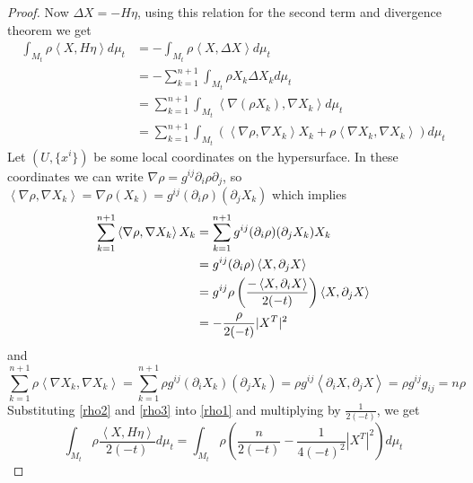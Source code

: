 \begin{proof}
Now $ \Delta X = - H \eta $, using this relation for the second term and divergence theorem we get 
\begin{align}
\int_{M_{t}}\rho \left< X,H \eta \right> d \mu_{t} & =  -\int_{M_{t}} \rho\left< X,\Delta X \right> d \mu_{t} \nonumber \\ 
& = - \sum_{k=1}^{n+1}\int_{M_{t}} \rho X_{k} \Delta X_{k} d \mu_{t}\nonumber \\
& = \sum_{k=1}^{n+1} \int_{M_{t}} \left< \nabla(\rho X_{k}), \nabla X_{k} \right>d \mu_{t}\nonumber \\ 
& = \sum_{k=1}^{n+1} \int_{M_{t}} \left( \left< \nabla\rho, \nabla X_{k} \right>X_{k} + \rho \left< \nabla X_{k}, \nabla X_{k} \right> \right)d \mu_{t} \label{rho1}
\end{align}
Let $ (U,\{x^{i}\}) $ be some local coordinates on the hypersurface. In these coordinates we can write $ \nabla \rho = g^{ij} \partial_{i} \rho \partial_{j} $, so $  \left< \nabla \rho , \nabla X_{k}\right> = \nabla \rho (X_{k}) = g^{ij} (\partial_{i}\rho) (\partial_{j}X_{k}) $ which implies 
\begin{align}
\sum_{k=1}^{n+1} \left< \nabla \rho , \nabla X_{k}  \right> X_{k} & = \sum_{k=1}^{n+1}  g^{ij} (\partial_{i}\rho) (\partial_{j}X_{k}) X_{k}\nonumber \\ 
& = g^{ij}( \partial_i \rho) \left< X, \partial_j X \right>\nonumber \\
& = g^{ij} \rho \left( \frac{-\left< X, \partial_{i}X \right>}{2(-t)} \right) \left< X, \partial_j X \right>\nonumber \\
& = - \frac{\rho}{2(-t)}|X^T|^2 \label{rho2}
\end{align}
and 
\begin{equation}
\sum_{k=1}^{n+1} \rho  \left< \nabla X_{k}, \nabla X_{k} \right> = \sum_{k=1}^{n+1} \rho g^{ij} (\partial_{i} X_{k} )(\partial_{j}X_{k}) = \rho g^{ij} \left<  \partial_{i}X, \partial_{j}X \right> = \rho g^{ij}g_{ij} = n \rho \label{rho3}
\end{equation}
Substituting \cref{rho2} and \cref{rho3} into \cref{rho1} and multiplying by $ \frac{1}{2(-t)} $, we get 
\begin{equation*}
\int_{M_{t}}\rho  \frac{\left< X,H \eta \right>}{2(-t)} d \mu_{t}  = \int_{M_{t}} \rho \left( \frac{n}{2(-t)} - \frac{1}{4(-t)^2}|X^T|^2  \right) d \mu_{t} 

\end{equation*}
\end{proof}
